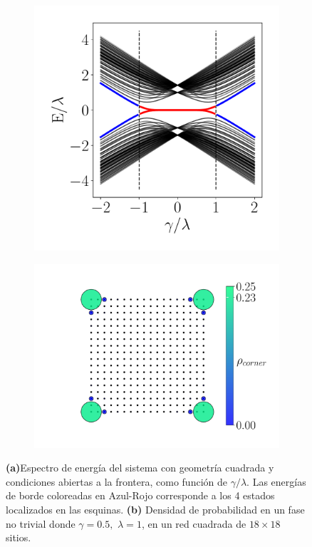 \begin{figure}[h!]
     \centering
    \captionsetup[sub]{font=small}
     \begin{subfigure}[b!]{0.43 \textwidth}
         \caption{}
         \includegraphics[width=\textwidth]{Imagenes/Resultados_Hoti_Cuadrado/bands_square_shh.pdf}
     \end{subfigure}
     \begin{subfigure}[b!]{0.56 \textwidth}
         \caption{}
         \includegraphics[width=\textwidth]{Imagenes/Resultados_Hoti_Cuadrado/proyection_square.pdf}
     \end{subfigure}\hspace*{1em} \vspace*{-0.5em}
        \caption{\textbf{(a)}Espectro de energía del sistema con geometría cuadrada y condiciones abiertas a la frontera, como función de $\gamma/\lambda$. Las energías de borde coloreadas en Azul-Rojo corresponde a los 4 estados localizados en las esquinas. \textbf{(b)} Densidad de probabilidad en un fase no trivial donde $\gamma = 0.5,\, \, \lambda = 1$, en un red cuadrada de $18\times18$ sitios.}
    \label{fig:Pram_Proy_cuadrado}
\end{figure}